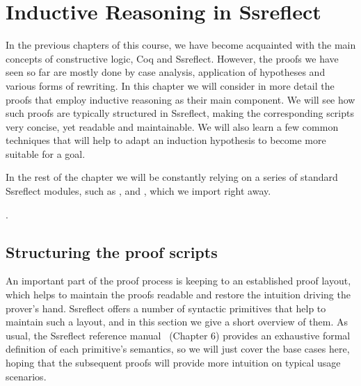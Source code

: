 \begin{coqdoccode}
\coqdocemptyline
\coqdocemptyline
\end{coqdoccode}
\chapter{Inductive Reasoning in Ssreflect}
\label{ch:ssrstyle}
 



In the previous chapters of this course, we have become acquainted
with the main concepts of constructive logic, Coq and
Ssreflect. However, the proofs we have seen so far are mostly done by
case analysis, application of hypotheses and various forms of
rewriting. In this chapter we will consider in more detail the proofs
that employ inductive reasoning as their main component. We will see
how such proofs are typically structured in Ssreflect, making the
corresponding scripts very concise, yet readable and maintainable. We
will also learn a few common techniques that will help to adapt an
induction hypothesis to become more suitable for a goal.


In the rest of the chapter we will be constantly relying on a series
of standard Ssreflect modules, such as ,  and
, which we import right away.


\begin{coqdoccode}
\coqdocemptyline
\coqdocnoindent
{} \coqdoceol
\coqdocnoindent
{}       .\coqdoceol
\coqdocemptyline
\coqdocemptyline
\end{coqdoccode}


\section{Structuring the proof scripts}


An important part of the proof process is keeping to an established
proof layout, which helps to maintain the proofs readable and restore
the intuition driving the prover's hand.  Ssreflect offers a number of
syntactic primitives that help to maintain such a layout, and in this
section we give a short overview of them. As usual, the Ssreflect
reference manual~\cite{Gontier-al:TR} (Chapter 6) provides an
exhaustive formal definition of each primitive's semantics, so we will
just cover the base cases here, hoping that the subsequent proofs will
provide more intuition on typical usage scenarios.


